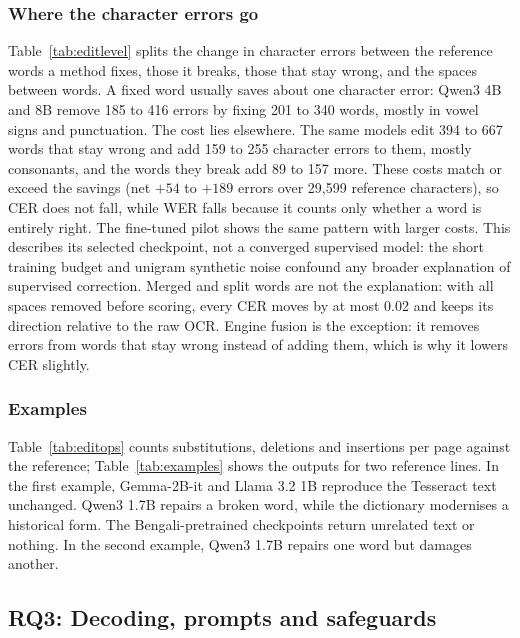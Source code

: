 \documentclass[conference]{IEEEtran}
\begin{document}
\subsubsection{Where the character errors go}
\label{sec:editlevel}
Table~\ref{tab:editlevel} splits the change in character errors between the reference words a method fixes, those it breaks, those that stay wrong, and the spaces between words. A fixed word usually saves about one character error: Qwen3 4B and 8B remove 185 to 416 errors by fixing 201 to 340 words, mostly in vowel signs and punctuation. The cost lies elsewhere. The same models edit 394 to 667 words that stay wrong and add 159 to 255 character errors to them, mostly consonants, and the words they break add 89 to 157 more. These costs match or exceed the savings (net $+54$ to $+189$ errors over 29{,}599 reference characters), so CER does not fall, while WER falls because it counts only whether a word is entirely right. The fine-tuned pilot shows the same pattern with larger costs. This describes its selected checkpoint, not a converged supervised model: the short training budget and unigram synthetic noise confound any broader explanation of supervised correction. Merged and split words are not the explanation: with all spaces removed before scoring, every CER moves by at most 0.02 and keeps its direction relative to the raw OCR. Engine fusion is the exception: it removes errors from words that stay wrong instead of adding them, which is why it lowers CER slightly.



\subsubsection{Examples}
Table~\ref{tab:editops} counts substitutions, deletions and insertions per page against the reference; Table~\ref{tab:examples} shows the outputs for two reference lines. In the first example, Gemma-2B-it and Llama 3.2 1B reproduce the Tesseract text unchanged. Qwen3 1.7B repairs a broken word, while the dictionary modernises a historical form. The Bengali-pretrained checkpoints return unrelated text or nothing. In the second example, Qwen3 1.7B repairs one word but damages another.



\subsection{RQ3: Decoding, prompts and safeguards}
\label{sec:rq3}
\end{document}
